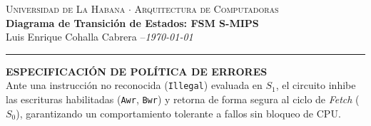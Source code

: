 \documentclass[11pt,a4paper]{article}
\begin{document}
\begin{center}
    {\color{maroon}\small \textsc{Universidad de La Habana $\cdot$ Arquitectura de Computadoras}}\\[0.6em]
    {\color{maroon}\LARGE \bfseries Diagrama de Transición de Estados: FSM S-MIPS}\\[0.4em]
    \small Luis Enrique Cohalla Cabrera \quad--\quad \textit{\today}
    \vspace{0.4em}
    {\color{maroon}\rule{0.4\textwidth}{0.6pt}}
\end{center}

\vspace{1em}

\begin{tcolorbox}[colback=boxbg, colframe=maroon, boxrule=0.5pt, leftrule=2.5pt, arc=0pt, left=8pt, right=8pt, top=6pt, bottom=6pt]
\textbf{\color{maroon} ESPECIFICACIÓN DE POLÍTICA DE ERRORES}\\
Ante una instrucción no reconocida (\texttt{Illegal}) evaluada en $S_1$, el circuito inhibe las escrituras habilitadas (\texttt{Awr}, \texttt{Bwr}) y retorna de forma segura al ciclo de \textit{Fetch} ($S_0$), garantizando un comportamiento tolerante a fallos sin bloqueo de CPU.
\end{tcolorbox}

\vspace{1.5em}
\end{document}
